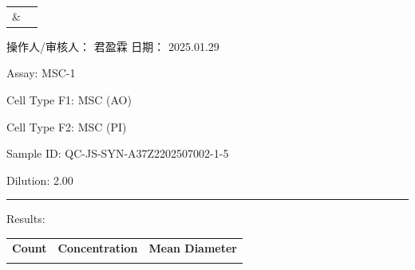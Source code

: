 \documentclass[UTF8,10pt,a4paper,fontset=fandol]{ctexart}
\newcommand{\fieldvalue}[1]{#1}
\newcommand{\handwritten}[1]{#1}
\begin{document}
\begin{center}
\begin{center}
\medskip
\begin{center}
\begin{tabular}{cc}
\parbox[c][0.22\textheight][c]{0.43\textwidth}{%
\centering
}
&
\parbox[c][0.22\textheight][c]{0.43\textwidth}{%
\centering
}
\\[1em]
\parbox[c][0.22\textheight][c]{0.43\textwidth}{%
\centering
}
&
\parbox[c][0.22\textheight][c]{0.43\textwidth}{%
\centering
}
\end{tabular}
\end{center}

\vfill

\noindent 操作人/审核人：
\fieldvalue{\handwritten{君盈霖}}
\hfill
日期：
\fieldvalue{\handwritten{2025.01.29}}

\newpage

Assay:
\fieldvalue{MSC-1}

Cell Type F1:
\fieldvalue{MSC (AO)}

Cell Type F2:
\fieldvalue{MSC (PI)}

Sample ID:
\fieldvalue{QC-JS-SYN-A37Z2202507002-1-5}

Dilution:
\fieldvalue{2.00}

\noindent\rule{\textwidth}{0.4pt}

Results:

\begin{tabularx}{\textwidth}{XXX}
\textbf{Count} & \textbf{Concentration} & \textbf{Mean Diameter} \\
\underline{\hspace{3.5cm}} &
\underline{\hspace{3.5cm}} &
\underline{\hspace{3.5cm}} \\


\end{tabularx}
\end{center}
\end{center}
\end{document}
